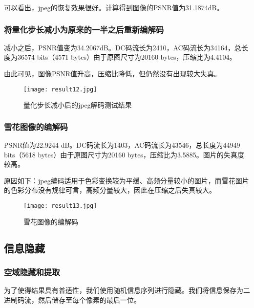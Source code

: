 \documentclass[a4paper]{article}
\begin{document}
\par 可以看出，jpeg的恢复效果很好。计算得到图像的PSNR值为31.1874dB。

\subsubsection{将量化步长减小为原来的一半之后重新编解码}
\par 减小之后，PSNR值变为34.2067dB。DC码流长为2410，AC码流长为34164，总长度为36574 bits（4571 bytes）由于原图尺寸为20160 bytes，压缩比为4.4104。

\par 由此可见，图像PSNR值升高，压缩比降低，但仍然没有出现较大失真。

\begin{figure}[ht]
    \centering
    \texttt{[image: result12.jpg]}
    \caption{量化步长减小后的jpeg解码测试结果}
    \label{fig:result 12}
\end{figure}

\subsubsection{雪花图像的编解码}

\par PSNR值为22.9244 dB。DC码流长为1403，AC码流长为43546，总长度为44949 bits（5618 bytes）由于原图尺寸为20160 bytes，压缩比为3.5885。图片的失真度较高。
\par 原因如下：jpeg编码适用于色彩变换较为平缓、高频分量较小的图片，而雪花图片的色彩分布没有规律可言，高频分量较大，因此在压缩之后失真较大。

\begin{figure}[ht]
    \centering
    \texttt{[image: result13.jpg]}
    \caption{雪花图像的编解码}
    \label{fig:result 13}
\end{figure}

\subsection{信息隐藏}

\subsubsection{空域隐藏和提取}

\par 为了使得结果具有普适性，我们使用随机信息序列进行隐藏。我们将信息保存为二进制码流，然后储存至每个像素的最后一位。
\end{document}

